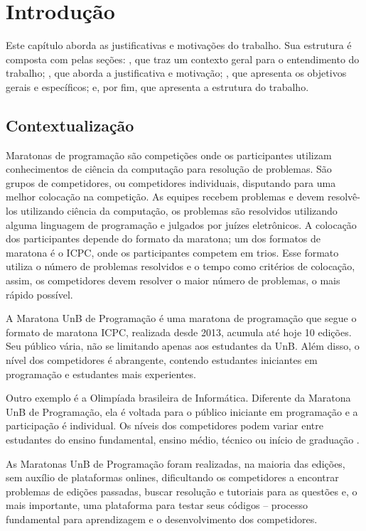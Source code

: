 \chapter{Introdução}

Este capítulo aborda as justificativas e motivações do trabalho. Sua estrutura é composta com pelas seções: 
, que traz um contexto geral para o entendimento do trabalho; 
, que aborda a justificativa e motivação; 
, que apresenta os objetivos gerais e específicos;
e, por fim,  que apresenta a estrutura do trabalho.

\section{Contextualização}
\label{sec:contextualizacao}

Maratonas de programação são competições onde os participantes utilizam conhecimentos de ciência da computação para resolução de problemas. São grupos de competidores, ou competidores individuais, disputando para uma melhor colocação na competição. As equipes recebem problemas e devem resolvê-los utilizando ciência da computação, os problemas são resolvidos utilizando alguma linguagem de programação e julgados por juízes eletrônicos. A colocação dos participantes depende do formato da maratona; um dos formatos de maratona é o ICPC, onde os participantes competem em trios. Esse formato utiliza o número de problemas resolvidos e o tempo como critérios de colocação, assim, os competidores devem resolver o maior número de problemas, o mais rápido possível.

A Maratona UnB de Programação é uma maratona de programação que segue o formato de maratona ICPC, realizada desde 2013, acumula até hoje 10 edições. Seu público vária, não se limitando apenas aos estudantes da UnB. Além disso, o nível dos competidores é abrangente, contendo estudantes iniciantes em programação e estudantes mais experientes.

Outro exemplo é a Olimpíada brasileira de Informática. Diferente da Maratona UnB de Programação, ela é voltada para o público iniciante em programação e a participação é individual. Os níveis dos competidores podem variar entre estudantes do ensino fundamental, ensino médio, técnico ou início de graduação \cite{obi2021:info}.

As Maratonas UnB de Programação foram realizadas, na maioria das edições, sem auxílio de plataformas onlines, dificultando os competidores a encontrar problemas de edições passadas, buscar resolução e tutoriais para as questões e, o mais importante, uma plataforma para testar seus códigos -- processo fundamental para aprendizagem e o desenvolvimento dos competidores.

